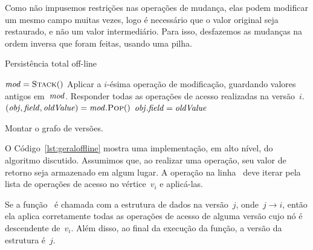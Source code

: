 \documentclass[../../main.tex]{subfiles}
\begin{document}
Como não impusemos restrições nas operações de mudança, elas podem modificar um mesmo campo muitas vezes, logo é necessário que o valor original seja restaurado, e não um valor intermediário. Para isso, desfazemos as mudanças na ordem inversa que foram feitas, usando uma pilha.

\begin{algorithm}
\caption{Persistência total off-line} \label{lst:geraloffline}
\begin{algorithmic}[1]

	\State $\V{mod} = \Call{Stack}{\null}$
	\State Aplicar a $i$-ésima operação de modificação, guardando valores antigos em~$\mathit{mod}$.
	\State Responder todas as operações de acesso realizadas na versão~$i$. \label{line:off:opac}
	 \label{line:off:for}
		\State {}
	\EndFor
	 \label{line:off:while}
		\State $(\V{obj}, \V{field}, \V{oldValue}) = \V{mod}.\Call{Pop}{\null}$
		\State $\mathit{obj}.\mathit{field} = \mathit{oldValue}$
	\EndWhile
\EndFunction

	\State Montar o grafo de versões.
	\State {}
\EndFunction

\end{algorithmic}
\end{algorithm}

O Código~\ref{lst:geraloffline} mostra uma implementação, em alto nível, do algoritmo discutido. Assumimos que, ao realizar uma operação, seu valor de retorno seja armazenado em algum lugar. A operação na linha~ deve iterar pela lista de operações de acesso no vértice~$v_i$ e aplicá-las.

\begin{proposition}
	Se a função~{\normalfont {}} é chamada com a estrutura de dados na versão~$j$, onde~${j \rightarrow i}$, então ela aplica corretamente todas as operações de acesso de alguma versão cujo nó é descendente de~$v_i$. Além disso, ao final da execução da função, a versão da estrutura é~$j$.
\end{proposition}
\end{document}
